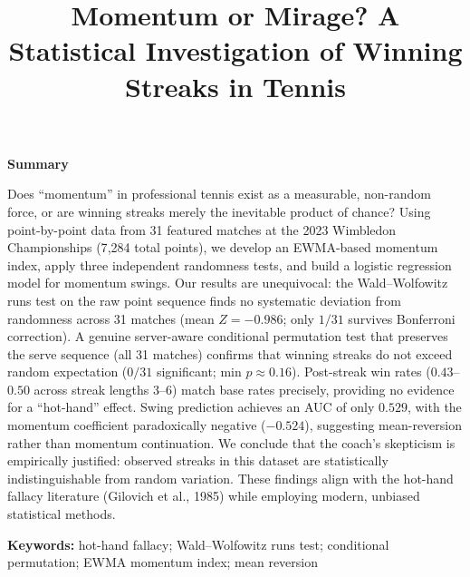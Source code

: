 \documentclass[11pt,a4paper]{article}
\title{\vspace{-2.5em}\textbf{Momentum or Mirage? A Statistical Investigation of Winning Streaks in Tennis}}
\author{}
\date{}
\begin{document}
\thispagestyle{fancy}
{\let\newpage\relax\maketitle}
\vspace{-2em}

\begin{center}\textbf{\large Summary}\end{center}
\noindent
Does ``momentum'' in professional tennis exist as a measurable, non-random force, or are winning streaks merely the inevitable product of chance? Using point-by-point data from 31 featured matches at the 2023 Wimbledon Championships (7{,}284 total points), we develop an EWMA-based momentum index, apply three independent randomness tests, and build a logistic regression model for momentum swings. Our results are unequivocal: the Wald--Wolfowitz runs test on the raw point sequence finds no systematic deviation from randomness across 31 matches (mean $Z = -0.986$; only $1/31$ survives Bonferroni correction). A genuine server-aware conditional permutation test that preserves the serve sequence (all 31 matches) confirms that winning streaks do not exceed random expectation ($0/31$ significant; min $p \approx 0.16$). Post-streak win rates ($0.43$--$0.50$ across streak lengths 3--6) match base rates precisely, providing no evidence for a ``hot-hand'' effect. Swing prediction achieves an AUC of only $0.529$, with the momentum coefficient paradoxically negative ($-0.524$), suggesting mean-reversion rather than momentum continuation. We conclude that the coach's skepticism is empirically justified: observed streaks in this dataset are statistically indistinguishable from random variation. These findings align with the hot-hand fallacy literature (Gilovich et al., 1985) while employing modern, unbiased statistical methods.

\vspace{1em}
\noindent\textbf{Keywords:} hot-hand fallacy; Wald--Wolfowitz runs test; conditional permutation; EWMA momentum index; mean reversion

\newpage
\fancyhead[C]{}
\tableofcontents
\newpage

\end{document}
